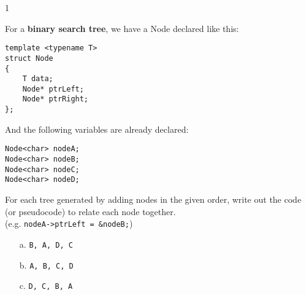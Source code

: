 \documentclass[a4paper,12pt,oneside]{book}
\newcounter{question}
\begin{document}
        \newpage


        \begin{question}{\thequestion}{1}
            
            For a \textbf{binary search tree}, we have a Node declared like this:
                    
\footnotesize 
\begin{verbatim}
template <typename T>
struct Node
{
    T data;
    Node* ptrLeft;
    Node* ptrRight;
};
\end{verbatim}
\normalsize

            And the following variables are already declared:

\begin{verbatim}
Node<char> nodeA;
Node<char> nodeB;
Node<char> nodeC;
Node<char> nodeD;
\end{verbatim}

            For each tree generated by adding nodes in the given order,
            write out the
            code (or pseudocode) to relate each node together. \\
            (e.g. \texttt{nodeA->ptrLeft = \&nodeB;})
            
            \begin{itemize}
                \item[a.]   \texttt{B, A, D, C}
                    \solution{}{ \vspace{3cm} }
                    
                \item[b.]   \texttt{A, B, C, D}
                    \solution{}{ \vspace{3cm} }

                \item[c.]   \texttt{D, C, B, A}
                    \solution{}{ \vspace{3cm} }
                    
            \end{itemize}
            
        \end{question}
\end{document}
